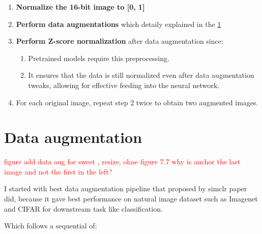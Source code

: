 \begin{enumerate}
  \item  \textbf{Normalize the 16-bit image to [0, 1]}
  
  \item \textbf{Perform data augmentations} which detaily explained in the \ref{sec:data augmentation}

  \item \textbf{Perform Z-score normalization} after data augmentation since:
  \begin{enumerate}
      \item Pretrained models require this preprocessing.
      \item It ensures that the data is still normalized even after data augmentation tweaks, allowing for effective feeding into the neural network.
  \end{enumerate}

  \item For each original image, repeat step 2 twice to obtain two augmented images.
\end{enumerate}

\section{Data augmentation} \label{sec:data augmentation}

\textcolor{red}{ figure add data aug for sweet , resize, ohne figure 7.7 why is anchor the last image and not the first in the left? }

I started with best data augmentation pipeline that proposed by simclr \cite{chen2020simple} paper did,
because it gave best performance on natural image dataset such as Imagenet and CIFAR for downstream task like classification. 

Which follows a sequential of:

